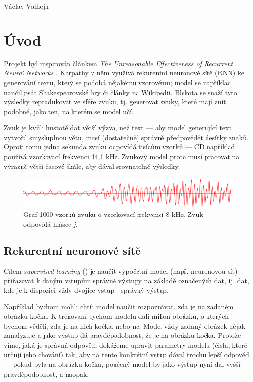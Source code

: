 \documentclass[a4]{article}
\begin{document}
\begin{flushright}
Václav Volhejn
\end{flushright}
\vfill

\section{Úvod}
Projekt byl inspirován článkem \textit{The Unreasonable Effectiveness of Recurrent Neural Networks} \cite{unreasonable}. Karpathy v něm využívá rekurentní neuronové sítě (RNN) ke generování textu, který se podobá nějakému vzorovému; model se například naučil psát Shakespearovské hry či články na Wikipedii. Blekota se snaží tyto výsledky reprodukovat ve sféře zvuku, tj. generovat zvuky, které mají znít podobně, jako ten, na kterém se model učí.

Zvuk je kvůli hustotě dat větší výzva, než text --- aby model generující text vytvořil smysluplnou větu, musí (dostatečně) správně předpovědět desítky znaků. Oproti tomu jedna sekunda zvuku odpovídá tisícům vzorků --- CD například používá vzorkovací frekvenci 44,1 kHz. Zvukový model proto musí pracovat na výrazně větší časové škále, aby dával srovnatelné výsledky.

\begin{figure}[h]
\centering
\includegraphics[width=\textwidth]{voice_example}
\caption{Graf 1000 vzorků zvuku o vzorkovací frekvenci 8 kHz. Zvuk odpovídá hlásce \textit{j}.}
\end{figure}

\subsection{Rekurentní neuronové sítě}
Cílem \textit{supervised learning} () je naučit výpočetní model (např. neuronovou síť) přiřazovat k daným vstupům správné výstupy na základě označených dat, tj. dat, kde je k dispozici vždy dvojice vstup---správný výstup.

Například bychom mohli chtít model naučit rozpoznávat, zda je na zadaném obrázku kočka. K trénovaní bychom modelu dali milion obrázků, o kterých bychom věděli, zda je na nich kočka, nebo ne. Model vždy zadaný obrázek nějak zanalyzuje a jako výstup dá pravděpodobnost, že je na obrázku kočka. Protože víme, jaká je správná odpověď, dokážeme upravit parametry modelu (čisla, které určují jeho chování) tak, aby na tento konkrétní vstup dával trochu lepší odpověď --- pokud byla na obrázku kočka, poučený model by jako výstup nyní dal vyšší pravděpodobnost, a naopak.
\end{document}
